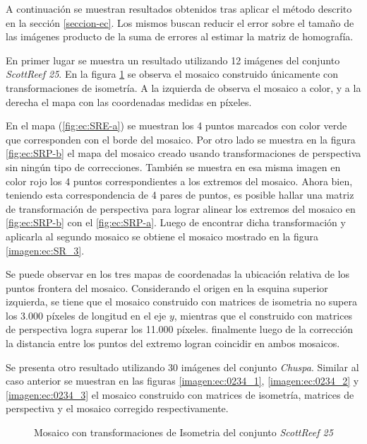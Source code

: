 A continuación se muestran resultados obtenidos tras aplicar el método descrito en la sección \ref{seccion-ec}. Los mismos buscan reducir el error sobre el tamaño de las imágenes producto de la suma de errores al estimar la matriz de homografía. 

En primer lugar se muestra un resultado utilizando 12 imágenes del conjunto \textit{ScottReef 25}. En la figura \ref{imagen:ec:SR_1} se observa el mosaico construido únicamente con transformaciones de isometría. A la izquierda de observa el mosaico a color, y a la derecha el mapa con las coordenadas medidas en píxeles.

En el mapa (\ref{fig:ec:SRE-a}) se muestran los 4 puntos marcados con color verde que corresponden con el borde del mosaico. Por otro lado se muestra en la figura \ref{fig:ec:SRP-b} el mapa del mosaico creado usando transformaciones de perspectiva sin ningún tipo de correcciones. También se muestra en esa misma imagen en color rojo los 4 puntos correspondientes a los extremos del mosaico. Ahora bien, teniendo esta correspondencia de 4 pares de puntos, es posible hallar una matriz de transformación de perspectiva para lograr alinear los extremos del mosaico en \ref{fig:ec:SRP-b} con el \ref{fig:ec:SRP-a}. Luego de encontrar dicha transformación y aplicarla al segundo mosaico se obtiene el mosaico mostrado en la figura  \ref{imagen:ec:SR_3}.

Se puede observar en los tres mapas de coordenadas la ubicación relativa de los puntos frontera del mosaico. Considerando el origen en la esquina superior izquierda, se tiene que el mosaico construido con matrices de isometria no supera los 3.000 píxeles de longitud en el eje $y$, mientras que el construido con matrices de perspectiva logra superar los 11.000 píxeles. finalmente luego de la corrección la distancia entre los puntos del extremo logran coincidir en ambos mosaicos.


Se presenta otro resultado utilizando 30 imágenes del conjunto \textit{Chuspa}. Similar al caso anterior se muestran en las figuras \ref{imagen:ec:0234_1}, \ref{imagen:ec:0234_2} y \ref{imagen:ec:0234_3} el mosaico construido con matrices de isometría, matrices de perspectiva y el mosaico corregido respectivamente.

\begin{figure}[H]
	\centering     %
	\hspace{1mm}%
	\hspace{1mm}%
	\caption[Mosaico con transformaciones de Isometria]{Mosaico con transformaciones de Isometria del conjunto \textit{ScottReef 25}}
	\label{imagen:ec:SR_1}
\end{figure}

